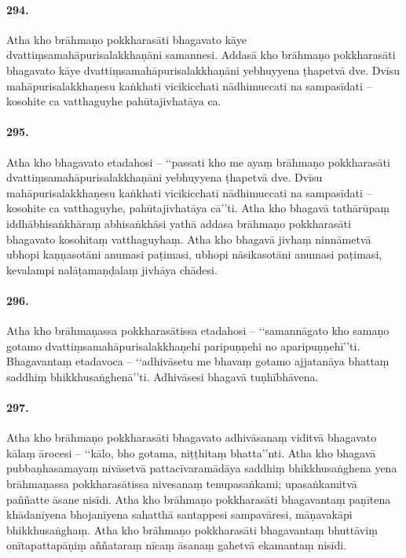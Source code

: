 \paragraph{294.} Atha kho brāhmaṇo pokkharasāti bhagavato kāye dvattiṃsamahāpurisalakkhaṇāni samannesi. Addasā kho brāhmaṇo pokkharasāti bhagavato kāye dvattiṃsamahāpurisalakkhaṇāni yebhuyyena ṭhapetvā dve. Dvīsu mahāpurisalakkhaṇesu kaṅkhati vicikicchati nādhimuccati na sampasīdati – kosohite ca vatthaguyhe pahūtajivhatāya ca.

\paragraph{295.} Atha kho bhagavato etadahosi – ‘‘passati kho me ayaṃ brāhmaṇo pokkharasāti dvattiṃsamahāpurisalakkhaṇāni yebhuyyena ṭhapetvā dve. Dvīsu mahāpurisalakkhaṇesu kaṅkhati vicikicchati nādhimuccati na sampasīdati – kosohite ca vatthaguyhe, pahūtajivhatāya cā’’ti. Atha kho bhagavā tathārūpaṃ iddhābhisaṅkhāraṃ abhisaṅkhāsi yathā addasa brāhmaṇo pokkharasāti bhagavato kosohitaṃ vatthaguyhaṃ. Atha kho bhagavā jivhaṃ ninnāmetvā ubhopi kaṇṇasotāni anumasi paṭimasi, ubhopi nāsikasotāni anumasi paṭimasi, kevalampi nalāṭamaṇḍalaṃ jivhāya chādesi.

\paragraph{296.} Atha kho brāhmaṇassa pokkharasātissa etadahosi – ‘‘samannāgato kho samaṇo gotamo dvattiṃsamahāpurisalakkhaṇehi paripuṇṇehi no aparipuṇṇehī’’ti. Bhagavantaṃ etadavoca – ‘‘adhivāsetu me bhavaṃ gotamo ajjatanāya bhattaṃ saddhiṃ bhikkhusaṅghenā’’ti. Adhivāsesi bhagavā tuṇhībhāvena.

\paragraph{297.} Atha kho brāhmaṇo pokkharasāti bhagavato adhivāsanaṃ viditvā bhagavato kālaṃ ārocesi – ‘‘kālo, bho gotama, niṭṭhitaṃ bhatta’’nti. Atha kho bhagavā pubbaṇhasamayaṃ nivāsetvā pattacīvaramādāya saddhiṃ bhikkhusaṅghena yena brāhmaṇassa pokkharasātissa nivesanaṃ tenupasaṅkami; upasaṅkamitvā paññatte āsane nisīdi. Atha kho brāhmaṇo pokkharasāti bhagavantaṃ paṇītena khādanīyena bhojanīyena sahatthā santappesi sampavāresi, māṇavakāpi bhikkhusaṅghaṃ. Atha kho brāhmaṇo pokkharasāti bhagavantaṃ bhuttāviṃ onītapattapāṇiṃ aññataraṃ nīcaṃ āsanaṃ gahetvā ekamantaṃ nisīdi.

